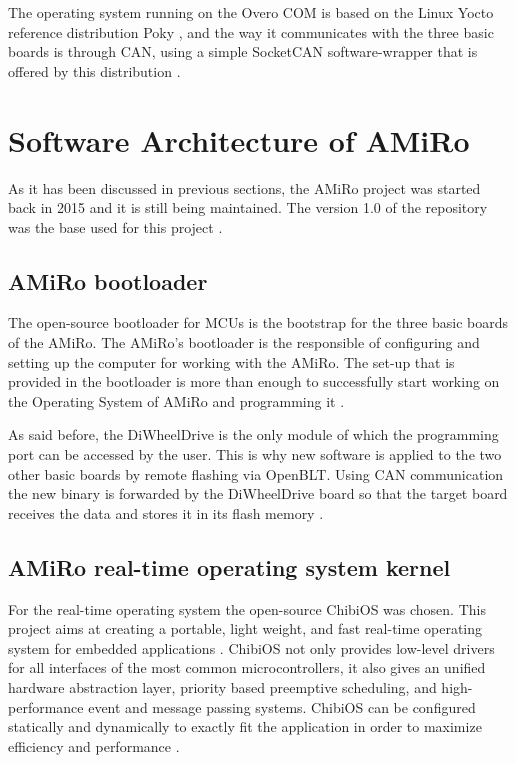 \documentclass[12pt]{report}%
\begin{document}
The operating system running on the Overo COM is based on the Linux Yocto reference distribution Poky \cite{poky}, and the way it communicates with the three basic boards is through CAN, using a simple SocketCAN software-wrapper that is offered by this distribution \cite{AMiRo_paper_modular}.

\section{Software Architecture of AMiRo}
\label{sec:soft}
As it has been discussed in previous sections, the AMiRo project was started back in 2015 and it is still being maintained. The version 1.0 of the repository was the base used for this project \cite{AMiRo_Git}.

\subsection{AMiRo bootloader}
\label{sub:btl}
The open-source bootloader for MCUs is the bootstrap for the three basic boards of the AMiRo. The AMiRo's bootloader is the responsible of configuring and setting up the computer for working with the AMiRo. The set-up that is provided in the bootloader is more than enough to successfully start working on the Operating System of AMiRo and programming it \cite{btl}.

As said before, the DiWheelDrive is the only module of which the programming port can be accessed by the user. This is why new software is applied to the two other basic boards by remote flashing via OpenBLT. Using CAN communication the new binary is forwarded by the DiWheelDrive board so that the target board receives the data and stores it in its flash memory \cite{AMiRo_paper_modular}.

\subsection{AMiRo real-time operating system kernel}
For the real-time operating system the open-source ChibiOS was chosen. This project aims at creating a portable, light weight, and fast real-time operating system for embedded applications \cite{chibioshp}. ChibiOS not only provides low-level drivers for all interfaces of the most common microcontrollers, it also gives an unified hardware abstraction layer, priority based preemptive scheduling, and high-performance event and message passing systems. ChibiOS can be configured statically and dynamically to exactly fit the application in order to maximize efficiency and performance \cite{AMiRo_paper_modular}.
\end{document}
